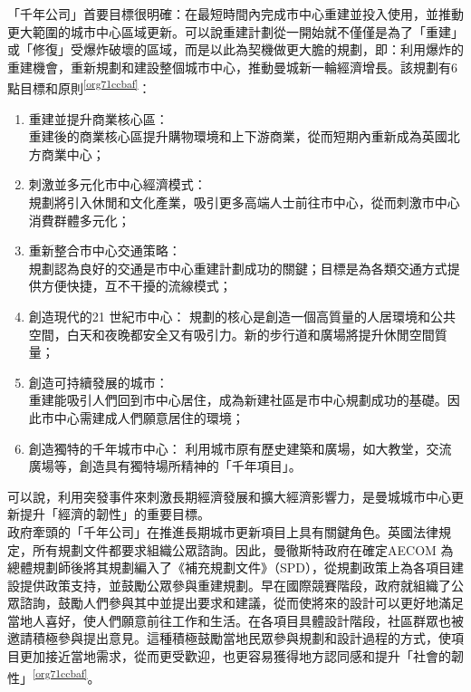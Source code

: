 \documentclass[a4paper,12pt]{article}
\begin{document}
\begin{enumerate}
「千年公司」首要目標很明確：在最短時間內完成市中心重建並投入使用，並推動更大範圍的城市中心區域更新。可以說重建計劃從一開始就不僅僅是為了「重建」或「修復」受爆炸破壞的區域，而是以此為契機做更大膽的規劃，即：利用爆炸的重建機會，重新規劃和建設整個城市中心，推動曼城新一輪經濟增長。該規劃有6 點目標和原則\textsuperscript{\ref{org71ccbaf}}：\\
\begin{enumerate}
\item 重建並提升商業核心區：\\
重建後的商業核心區提升購物環境和上下游商業，從而短期內重新成為英國北方商業中心；\\
\item 刺激並多元化市中心經濟模式：\\
規劃將引入休閒和文化產業，吸引更多高端人士前往市中心，從而刺激市中心消費群體多元化；\\
\item 重新整合市中心交通策略：\\
規劃認為良好的交通是市中心重建計劃成功的關鍵；目標是為各類交通方式提供方便快捷，互不干擾的流線模式；\\
\item 創造現代的21 世紀市中心：   規劃的核心是創造一個高質量的人居環境和公共空間，白天和夜晚都安全又有吸引力。新的步行道和廣場將提升休閒空間質量；\\
\item 創造可持續發展的城市：\\
重建能吸引人們回到市中心居住，成為新建社區是市中心規劃成功的基礎。因此市中心需建成人們願意居住的環境；\\
\item 創造獨特的千年城市中心：   利用城市原有歷史建築和廣場，如大教堂，交流廣場等，創造具有獨特場所精神的「千年項目」。\\
\end{enumerate}
可以說，利用突發事件來刺激長期經濟發展和擴大經濟影響力，是曼城城市中心更新提升「經濟的韌性」的重要目標。\\

政府牽頭的「千年公司」在推進長期城市更新項目上具有關鍵角色。英國法律規定，所有規劃文件都要求組織公眾諮詢。因此，曼徹斯特政府在確定AECOM 為總體規劃師後將其規劃編入了《補充規劃文件》（SPD），從規劃政策上為各項目建設提供政策支持，並鼓勵公眾參與重建規劃。早在國際競賽階段，政府就組織了公眾諮詢，鼓勵人們參與其中並提出要求和建議，從而使將來的設計可以更好地滿足當地人喜好，使人們願意前往工作和生活。在各項目具體設計階段，社區群眾也被邀請積極參與提出意見。這種積極鼓勵當地民眾參與規劃和設計過程的方式，使項目更加接近當地需求，從而更受歡迎，也更容易獲得地方認同感和提升「社會的韌性」\textsuperscript{\ref{org71ccbaf}}。\\


\end{enumerate}
\end{document}
